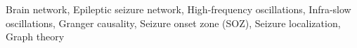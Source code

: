 Brain network, Epileptic seizure network, High-frequency oscillations, Infra-slow oscillations, Granger causality, Seizure onset zone (SOZ), Seizure localization, Graph theory